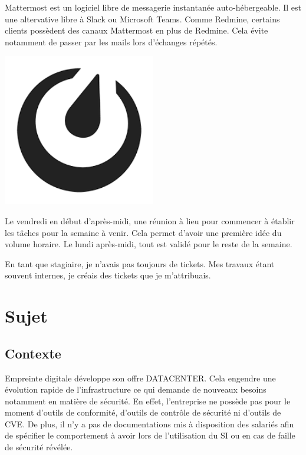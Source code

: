 \documentclass[12pt]{article}
\begin{document}
\noindent%
\begin{minipage}{.7\textwidth}%
Mattermost est un logiciel libre de messagerie instantanée auto-hébergeable.
Il est une altervative libre à \gls{Slack} ou \gls{Microsoft Teams}.
Comme \gls{Redmine}, certains clients possèdent des canaux Mattermost en plus de \gls{Redmine}.
Cela évite notamment de passer par les mails lors d'échanges répétés. \\
\end{minipage}%
\hfill
\begin{minipage}{.3\textwidth}%
\begin{center}
\includegraphics[width=0.5\textwidth]{src/logo_mattermost.png}
\end{center}
\end{minipage}%

Le vendredi en début d'après-midi, une réunion à lieu pour commencer à établir les tâches pour la semaine à venir.
Cela permet d'avoir une première idée du volume horaire.
Le lundi après-midi, tout est validé pour le reste de la semaine.

En tant que stagiaire, je n'avais pas toujours de tickets.
Mes travaux étant souvent internes, je créais des tickets que je m'attribuais.

\newpage
\section{Sujet}
\subsection{Contexte}
Empreinte digitale développe son offre DATACENTER. 
Cela engendre une évolution rapide de l'infrastructure ce qui demande de nouveaux besoins notamment en matière de sécurité. 
En effet, l'entreprise ne possède pas pour le moment d'outils de conformité, d'outils de contrôle de sécurité ni d'outils de \gls{CVE}. 
De plus, il n'y a pas de documentations mis à disposition des salariés afin de spécifier le comportement à avoir lors de l'utilisation du \gls{SI} ou en cas de faille de sécurité révélée.
\end{document}
